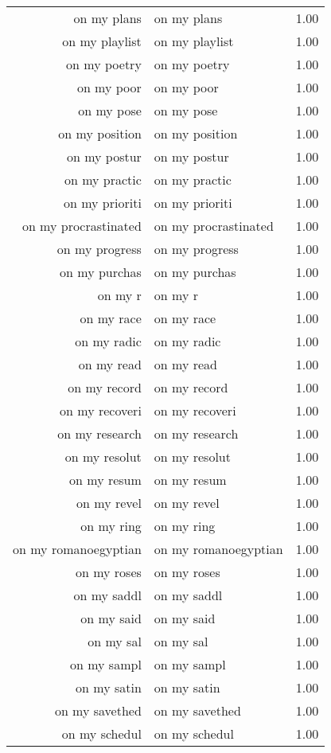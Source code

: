 \begin{table}[ht]
\begin{tabular}{rlr}
  on my plans & on my plans & 1.00 \\ 
  on my playlist & on my playlist & 1.00 \\ 
  on my poetry & on my poetry & 1.00 \\ 
  on my poor & on my poor & 1.00 \\ 
  on my pose & on my pose & 1.00 \\ 
  on my position & on my position & 1.00 \\ 
  on my postur & on my postur & 1.00 \\ 
  on my practic & on my practic & 1.00 \\ 
  on my prioriti & on my prioriti & 1.00 \\ 
  on my procrastinated & on my procrastinated & 1.00 \\ 
  on my progress & on my progress & 1.00 \\ 
  on my purchas & on my purchas & 1.00 \\ 
  on my r & on my r & 1.00 \\ 
  on my race & on my race & 1.00 \\ 
  on my radic & on my radic & 1.00 \\ 
  on my read & on my read & 1.00 \\ 
  on my record & on my record & 1.00 \\ 
  on my recoveri & on my recoveri & 1.00 \\ 
  on my research & on my research & 1.00 \\ 
  on my resolut & on my resolut & 1.00 \\ 
  on my resum & on my resum & 1.00 \\ 
  on my revel & on my revel & 1.00 \\ 
  on my ring & on my ring & 1.00 \\ 
  on my romanoegyptian & on my romanoegyptian & 1.00 \\ 
  on my roses & on my roses & 1.00 \\ 
  on my saddl & on my saddl & 1.00 \\ 
  on my said & on my said & 1.00 \\ 
  on my sal & on my sal & 1.00 \\ 
  on my sampl & on my sampl & 1.00 \\ 
  on my satin & on my satin & 1.00 \\ 
  on my savethed & on my savethed & 1.00 \\ 
  on my schedul & on my schedul & 1.00 \\ 

\end{tabular}
\end{table}
